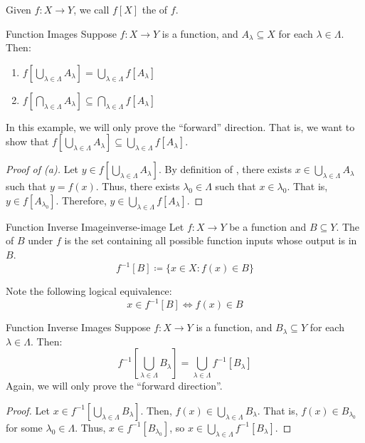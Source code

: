 Given $f : X \to Y$, we call $f[X]$ the  of $f$.

\begin{exbox}{Function Images}{}
    Suppose $f : X \to Y$ is a function, and $A_\lambda \subseteq X$ for each $\lambda \in \Lambda$. Then:
    \begin{enumerate}[label=(\alph*)]
        \item $f \left[ \bigcup_{\lambda \in \Lambda} A_\lambda \right] = \bigcup_{\lambda \in \Lambda} f \left[ A_\lambda \right]$
        \item $f \left[ \bigcap_{\lambda \in \Lambda} A_\lambda \right] \subseteq \bigcap_{\lambda \in \Lambda} f \left[ A_\lambda \right]$
    \end{enumerate}
    \tcblower
    In this example, we will only prove the ``forward'' direction. That is, we want to show that $f \left[ \bigcup_{\lambda \in \Lambda} A_\lambda \right] \subseteq \bigcup_{\lambda \in \Lambda} f \left[ A_\lambda \right]$.
    \begin{proof}[Proof of (a)]
        Let $y \in f \left[ \bigcup_{\lambda \in \Lambda} A_\lambda \right]$. By definition of , there exists $x \in \bigcup_{\lambda \in \Lambda} A_\lambda$ such that $y = f(x)$. Thus, there exists $\lambda_0 \in \Lambda$ such that $x \in \lambda_0$. That is, $y \in f \left[ A_{\lambda_0} \right]$. Therefore, $y \in \bigcup_{\lambda \in \Lambda} f \left[ A_\lambda \right]$.
    \end{proof}
\end{exbox}

\begin{dfnbox}{Function Inverse Image}{inverse-image}
    Let $f : X \to Y$ be a function and $B \subseteq Y$. The  of $B$ under $f$ is the set containing all possible function inputs whose output is in $B$.
    \tcblower
    \[ f^{-1}[B] \coloneq \{ x \in X: f(x) \in B \} \]
\end{dfnbox}

Note the following logical equivalence:
\[ x \in f^{-1} [B] \iff f(x) \in B \]

\begin{exbox}{Function Inverse Images}{}
    Suppose $f : X \to Y$ is a function, and $B_\lambda \subseteq Y$ for each $\lambda \in \Lambda$. Then:
    \[ f^{-1} \left[ \bigcup_{\lambda \in \Lambda} B_\lambda \right] = \bigcup_{\lambda \in \Lambda} f^{-1} \left[ B_\lambda \right] \]
    \tcblower
    Again, we will only prove the ``forward direction''.
    \begin{proof}
        Let $x \in f^{-1} \left[ \bigcup_{\lambda \in \Lambda} B_\lambda \right]$. Then, $f(x) \in \bigcup_{\lambda \in \Lambda} B_\lambda$. That is, $f(x) \in B_{\lambda_0}$ for some $\lambda_0 \in \Lambda$. Thus, $x \in f^{-1} \left[ B_{\lambda_0} \right]$, so $x \in \bigcup_{\lambda \in \Lambda} f^{-1} \left[ B_\lambda \right]$.
    \end{proof}
\end{exbox}

